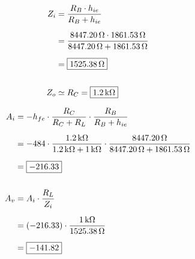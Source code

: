       
      \noindent
      \begin{minipage}[t]{0.45\linewidth}
      \begin{align*}
      Z_i &= \frac{R_B \cdot h_{ie}}{R_B + h_{ie}} \\[6pt]
          &= \frac{8447.20\,\Omega \cdot 1861.53\,\Omega}{8447.20\,\Omega + 1861.53\,\Omega} \\[6pt]
          &= \boxed{1525.38\,\Omega} \\[16pt]
      Z_o &\simeq R_C = \boxed{1.2\,\text{k}\Omega}
      \end{align*}
      \end{minipage}\hfill
      \begin{minipage}[t]{0.45\linewidth}
      \begin{align*}
      A_i &= -h_{fe}\cdot \frac{R_C}{R_C+R_L}\cdot \frac{R_B}{R_B+h_{ie}} \\[6pt]
          &= -484 \cdot \frac{1.2\,\text{k}\Omega}{1.2\,\text{k}\Omega+1\,\text{k}\Omega}\cdot \frac{8447.20\,\Omega}{8447.20\,\Omega+1861.53\,\Omega} \\[6pt]
          &= \boxed{-216.33} \\[16pt]
      A_v &= A_i \cdot \frac{R_L}{Z_i} \\[6pt]
          &= (-216.33)\cdot \frac{1\,\text{k}\Omega}{1525.38\,\Omega} \\[6pt]
          &= \boxed{-141.82}
      \end{align*}
      \end{minipage}    

